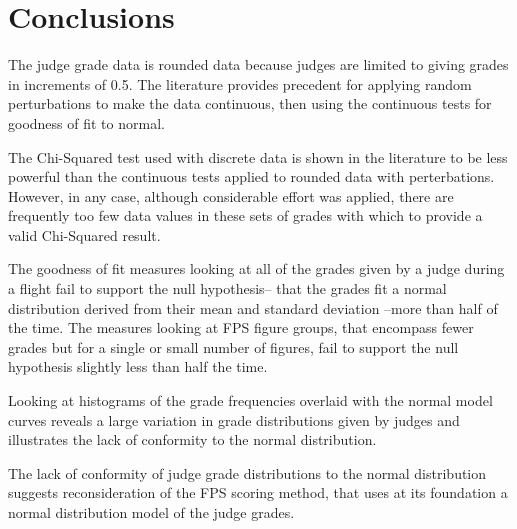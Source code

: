 \section{Conclusions}

The judge grade data is rounded data because judges are limited to giving
grades in increments of 0.5. The literature provides precedent for applying
random perturbations to make the data continuous, then using the continuous
tests for goodness of fit to normal.

The Chi-Squared test used with discrete data is shown in the literature
to be less powerful than the continuous tests applied to rounded data with
perterbations. However, in any case, although considerable effort was
applied, there are frequently too few data
values in these sets of grades with which to provide a valid Chi-Squared
result.

The goodness of fit measures looking at all of the grades given by a judge
during a flight fail to support the null hypothesis-- that the grades
fit a normal distribution derived from their mean and standard deviation
--more than half of the time.
The measures looking at FPS figure groups, that encompass fewer grades but
for a single or small number of figures, fail to support the null hypothesis
slightly less than half the time.

Looking at histograms of the grade frequencies overlaid with the normal
model curves reveals a large variation in grade distributions given by
judges and illustrates the lack of conformity to the normal distribution.

The lack of conformity of judge grade distributions to the normal distribution
suggests reconsideration of the FPS scoring method, that uses at its
foundation a normal distribution model of the judge grades.

